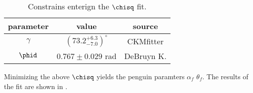 \begin{table}[!h]
  \center
  \begin{tabular}{c c c}
    \hline
    parameter & value & source \\
    \hline
    $\gamma$      & $\left(73.2_{-7.0}^{+6.3}\right)^{\circ}$ & CKMfitter \cite{Charles:2015gya} \\
    $\phid$       & $0.767 \pm 0.029$ rad & DeBruyn K.\cite{DeBruyn-thesis} \\
    \hline
  \end{tabular}
  \caption{\small Constrains enterign the $\chisq$ fit.}
  \label{chi2_fit_constrains}
\end{table}

\noindent Minimizing the above $\chisq$ yields the penguin paramters $\alpha_f$ $\theta_f$.
The results of the fit are shown in .
